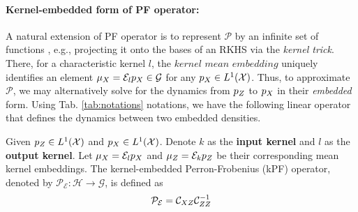 \paragraph{Kernel-embedded form of PF operator:} A natural 
extension of PF operator 
is to represent $\mathcal{P}$ by an infinite set of functions \citep{klus2020eigendecompositions}, e.g., projecting it onto the bases of an RKHS via the \textit{kernel trick}. There, for a characteristic kernel $l$, the $\textit{kernel mean embedding}$ uniquely identifies an element $\mu_{\var{x}} = \mathcal{E}_{l}p_{\var{x}} \in \spc{G}$ for any $p_{\var{x}} \in L^1(\spc{X})$. Thus, to approximate $\mathcal{P}$, we may alternatively solve for the dynamics from $p_{\var{z}}$ to $p_{\var{x}}$ in their {\em embedded} form. Using Tab. \ref{tab:notations} notations, we have the following linear operator that defines the dynamics between two embedded densities.


\begin{definition}
\label{def:kpf}Given $p_{\var{z}} \in L^1(\mathcal{X})$ and $p_{\var{x}} \in L^1(\mathcal{X})$. Denote $k$ as the \textbf{input kernel} and $l$ as the \textbf{output kernel}. Let $\mu_{\var{x}} = \mathcal{E}_l p_{\var{x}}$ and $\mu_{\var{z}} = \mathcal{E}_k p_{\var{z}}$ be their corresponding mean kernel embeddings. The kernel-embedded Perron-Frobenius (kPF) operator, denoted
by $\mathcal{P}_{\mathcal{E}}:\mathcal{H}\rightarrow \mathcal{G}$, is defined as
\begin{align}
    \mathcal{P}_\mathcal{E} = \mathcal{C}_{\var{x}\var{z}}\mathcal{C}_{\var{z}\var{z}}^{-1}
\end{align}
\end{definition}

